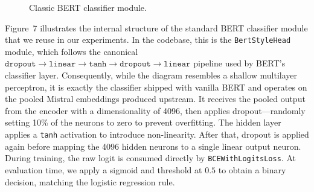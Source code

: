 \documentclass[12pt]{article}
\begin{document}
\begin{figure}[htbp]
\begin{adjustwidth}{-0.3cm}{0cm}
\begin{minipage}{1\textwidth}
\end{minipage}
\end{adjustwidth}
\caption{Classic BERT classifier module.}
\label{fig:bert-classifier-module}
\end{figure}

Figure~7 illustrates the internal structure of the standard BERT classifier module that we reuse in our experiments. 
In the codebase, this is the \texttt{BertStyleHead} module, which follows the canonical $\texttt{dropout} \rightarrow \texttt{linear} \rightarrow \texttt{tanh} \rightarrow \texttt{dropout} \rightarrow \texttt{linear}$ pipeline used by BERT's classifier layer. 
Consequently, while the diagram resembles a shallow multilayer perceptron, it is exactly the classifier shipped with vanilla BERT and operates on the pooled Mistral embeddings produced upstream.
It receives the pooled output from the encoder with a dimensionality of 4096, then applies dropout\;---\;randomly setting 10\% of the neurons to zero to prevent overfitting. 
The hidden layer applies a \texttt{tanh} activation to introduce non-linearity. 
After that, dropout is applied again before mapping the 4096 hidden neurons to a single linear output neuron. 
During training, the raw logit is consumed directly by \texttt{BCEWithLogitsLoss}. 
At evaluation time, we apply a sigmoid and threshold at $0.5$ to obtain a binary decision, matching the logistic regression rule.
\end{document}
